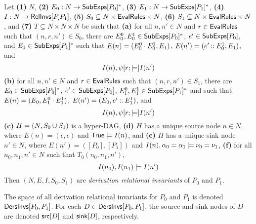 \begin{defn}
  \label{defn:der-rel-invs}
  Let \textbf{(1)} $N$, %
  \textbf{(2)} $E_0 : N \to \mathsf{SubExps}[ P_0 ]^{*}$, %
  \textbf{(3)} $E_1 : N \to \mathsf{SubExps}[ P_1 ]^{*}$, %
  \textbf{(4)} $I: N \to \mathsf{RelInvs}[ P_, P_1 ]$,
  \textbf{(5)} $S_0 \subseteq N \times \mathsf{EvalRules} \times N$, 
  \textbf{(6)} $S_1 \subseteq N \times \mathsf{EvalRules} \times N$, and
  \textbf{(7)} $T \subseteq N \times N \times N$ be such that%
  \textbf{(a)} for all $n, n' \in N$ and $r \in \mathsf{EvalRules}$ such that
  $(n, r, n') \in S_0$, there are $E_0^0, E_0^1 \in
  \mathsf{SubExps}[ P_0 ]^{*}$, $e' \in \mathsf{SubExps}[ P_0 ]$, and $E_1 \in
  \mathsf{SubExps}[ P_1 ]^{*}$ such that $E(n) = (E_0^0 \cdot E_0^1, E_1)$,
  $E(n') = (e' \mathbin{::} E_0^1, E_1)$, and
  \[ I(n), \psi[  r  ; \models ] I(n')
  \]
  \textbf{(b)} for all $n, n' \in N$ and $r \in \mathsf{EvalRules}$ such that
  $(n, r, n') \in S_1$, there are $E_0 \in \mathsf{SubExps}[ P_0 ]^{*}$, $e' \in
  \mathsf{SubExps}[ P_0 ]$, $E_1^0, E_1^1 \in \mathsf{SubExps}[ P_1 ]^{*}$ and such that
  $E(n) = (E_0, E_1^0 \cdot E_1^1)$, $E(n') = (E_0, e' \mathbin{::}
  E_1^1)$, and
  \[ I(n), \psi[ r ; \models ] I(n') 
  \]
  \textbf{(c)} $H = (N, S_0 \cup S_1)$ is a hyper-DAG,
  \textbf{(d)} $H$ has a unique source node $n \in N$, where $E(n) =
  (\epsilon, \epsilon)$ and $\mathsf{True} \models I(n)$, and
  \textbf{(e)} $H$ has a unique sink node $n' \in N$, where $E(n') =
  ([ P_0 ], [ P_1 ])$ and $I(n), \alpha_0 = \alpha_1 \models \nu_0 =
  \nu_1$, %
  \textbf{(f)} for all $n_0, n_1, n' \in N$ such that $T_0(n_0, n_1,
  n')$, 
  \[ I(n_0), I(n_1) \models I(n')
  \]
  Then $(N, E, I, S_0, S_1)$ are \emph{derivation relational
    invariants} of $P_0$ and $P_1$.
\end{defn}
%
The space of all derivation relational invariants for $P_0$ and $P_1$
is denoted $\mathsf{DersInvs}[ P_0, P_1 ]$.
%
For each $D \in \mathsf{DersInvs}[ P_0, P_1 ]$, the source and sink nodes of
$D$ are denoted $\mathsf{src}[ D ]$ and $\mathsf{sink}[ D ]$, respectively.
%

